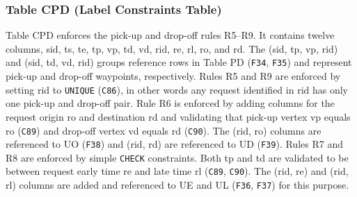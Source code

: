 \documentclass{article}
\theoremstyle{definition}                   %
\begin{document}
\subsubsection{Table CPD (Label Constraints Table)}
Table CPD enforces the pick-up and drop-off rules R5--R9. It contains twelve
columns, \textsf{sid}, \textsf{ts}, \textsf{te}, \textsf{tp}, \textsf{vp},
\textsf{td}, \textsf{vd}, \textsf{rid}, \textsf{re}, \textsf{rl}, \textsf{ro},
and \textsf{rd}.  The (\textsf{sid}, \textsf{tp}, \textsf{vp}, \textsf{rid})
and (\textsf{sid}, \textsf{td}, \textsf{vd}, \textsf{rid}) groups reference
rows in Table PD ({\tt{}F34}, {\tt{}F35}) and represent pick-up and drop-off
waypoints, respectively.  Rules R5 and R9 are enforced by setting \textsf{rid}
to \texttt{UNIQUE} ({\tt{}C86}), in other words any request identified in
\textsf{rid} has only one pick-up and drop-off pair.  Rule R6 is enforced by
adding columns for the request origin \textsf{ro} and destination \textsf{rd}
and validating that pick-up vertex \textsf{vp} equals \textsf{ro} ({\tt{}C89}) and
drop-off vertex \textsf{vd} equals \textsf{rd} ({\tt{}C90}). The (\textsf{rid},
\textsf{ro}) columns are referenced to UO ({\tt{}F38}) and (\textsf{rid},
\textsf{rd}) are referenced to UD ({\tt{}F39}).  Rules R7 and R8 are enforced by
simple \texttt{CHECK} constraints. Both \textsf{tp} and \textsf{td} are
validated to be between request early time \textsf{re} and late time
\textsf{rl} ({\tt{}C89}, {\tt{}C90}). The (\textsf{rid}, \textsf{re}) and
(\textsf{rid}, \textsf{rl}) columns are added and referenced to UE and UL
({\tt{}F36}, {\tt{}F37}) for this purpose.
\end{document}
